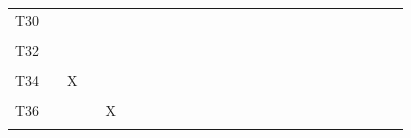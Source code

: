 \documentclass[
]{article}
\begin{document}
\begin{longtable}[l]{lllllllllllllllllllllllll}
T30 &  &  &  &  &  &  &  &  &  &  &  &  &  &  &  &  &  &  &  &  &  &  &  & \\
\addlinespace
\cellcolor{gray!6}{T31} & \cellcolor{gray!6}{} & \cellcolor{gray!6}{} & \cellcolor{gray!6}{} & \cellcolor{gray!6}{} & \cellcolor{gray!6}{} & \cellcolor{gray!6}{} & \cellcolor{gray!6}{} & \cellcolor{gray!6}{} & \cellcolor{gray!6}{} & \cellcolor{gray!6}{} & \cellcolor{gray!6}{} & \cellcolor{gray!6}{} & \cellcolor{gray!6}{} & \cellcolor{gray!6}{} & \cellcolor{gray!6}{} & \cellcolor{gray!6}{} & \cellcolor{gray!6}{} & \cellcolor{gray!6}{} & \cellcolor{gray!6}{} & \cellcolor{gray!6}{} & \cellcolor{gray!6}{} & \cellcolor{gray!6}{} & \cellcolor{gray!6}{} & \cellcolor{gray!6}{}\\
T32 &  &  &  &  &  &  &  &  &  &  &  &  &  &  &  &  &  &  &  &  &  &  &  & \\
\cellcolor{gray!6}{T33} & \cellcolor{gray!6}{X} & \cellcolor{gray!6}{} & \cellcolor{gray!6}{} & \cellcolor{gray!6}{} & \cellcolor{gray!6}{} & \cellcolor{gray!6}{} & \cellcolor{gray!6}{} & \cellcolor{gray!6}{} & \cellcolor{gray!6}{} & \cellcolor{gray!6}{} & \cellcolor{gray!6}{} & \cellcolor{gray!6}{} & \cellcolor{gray!6}{} & \cellcolor{gray!6}{} & \cellcolor{gray!6}{} & \cellcolor{gray!6}{} & \cellcolor{gray!6}{} & \cellcolor{gray!6}{} & \cellcolor{gray!6}{} & \cellcolor{gray!6}{} & \cellcolor{gray!6}{} & \cellcolor{gray!6}{} & \cellcolor{gray!6}{} & \cellcolor{gray!6}{}\\
T34 &  & X &  &  &  &  &  &  &  &  &  &  &  &  &  &  &  &  &  &  &  &  &  & \\
\cellcolor{gray!6}{T35} & \cellcolor{gray!6}{} & \cellcolor{gray!6}{} & \cellcolor{gray!6}{X} & \cellcolor{gray!6}{} & \cellcolor{gray!6}{} & \cellcolor{gray!6}{} & \cellcolor{gray!6}{} & \cellcolor{gray!6}{} & \cellcolor{gray!6}{} & \cellcolor{gray!6}{} & \cellcolor{gray!6}{} & \cellcolor{gray!6}{} & \cellcolor{gray!6}{} & \cellcolor{gray!6}{} & \cellcolor{gray!6}{} & \cellcolor{gray!6}{} & \cellcolor{gray!6}{} & \cellcolor{gray!6}{} & \cellcolor{gray!6}{} & \cellcolor{gray!6}{} & \cellcolor{gray!6}{} & \cellcolor{gray!6}{} & \cellcolor{gray!6}{} & \cellcolor{gray!6}{}\\
\addlinespace
T36 &  &  &  & X &  &  &  &  &  &  &  &  &  &  &  &  &  &  &  &  &  &  &  & \\
\cellcolor{gray!6}{T37} & \cellcolor{gray!6}{} & \cellcolor{gray!6}{} & \cellcolor{gray!6}{} & \cellcolor{gray!6}{} & \cellcolor{gray!6}{X} & \cellcolor{gray!6}{} & \cellcolor{gray!6}{} & \cellcolor{gray!6}{} & \cellcolor{gray!6}{} & \cellcolor{gray!6}{} & \cellcolor{gray!6}{} & \cellcolor{gray!6}{} & \cellcolor{gray!6}{} & \cellcolor{gray!6}{} & \cellcolor{gray!6}{} & \cellcolor{gray!6}{} & \cellcolor{gray!6}{} & \cellcolor{gray!6}{} & \cellcolor{gray!6}{} & \cellcolor{gray!6}{} & \cellcolor{gray!6}{} & \cellcolor{gray!6}{} & \cellcolor{gray!6}{} & \cellcolor{gray!6}{}\\

\end{longtable}
\end{document}

